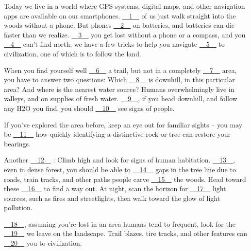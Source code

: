 Today we live in a world where GPS systems, digital maps, and other navigation apps are available on our smartphones. \uline{~~1~~} of us just walk straight into the woods without a phone. But phones \uline{~~2~~} on batteries, and batteries can die faster than we realize. \uline{~~3~~} you get lost without a phone or a compass, and you \uline{~~4~~} can't find north, we have a few tricks to help you navigate \uline{~~5~~} to civilization, one of which is to follow the land.


When you find yourself well \uline{~~6~~} a trail, but not in a completely \uline{~~7~~} area, you have to answer two questions: Which \uline{~~8~~} is downhill, in this particular area? And where is the nearest water source? Humans overwhelmingly live in valleys, and on supplies of fresh water. \uline{~~9~~}, if you head downhill, and follow any H2O you find, you should \uline{~~10~~} see signs of people.


If you've explored the area before, keep an eye out for familiar sights – you may be \uline{~~11~~} how quickly identifying a distinctive rock or tree can restore your bearings.


Another \uline{~~12~~} : Climb high and look for signs of human habitation. \uline{~~13~~}, even in dense forest, you should be able to \uline{~~14~~} gaps in the tree line due to roads,  train tracks,  and other paths  people carve \uline{~~15~~} the woods. Head toward these \uline{~~16~~} to find a way out. At night, scan the horizon for \uline{~~17~~} light sources, such as fires and streetlights, then walk toward the glow of light pollution.


\uline{~~18~~}, assuming you're lost in an area humans tend to frequent, look for the \uline{~~19~~} we leave on the landscape. Trail blazes, tire tracks, and other features  can \uline{~~20~~} you to civilization.